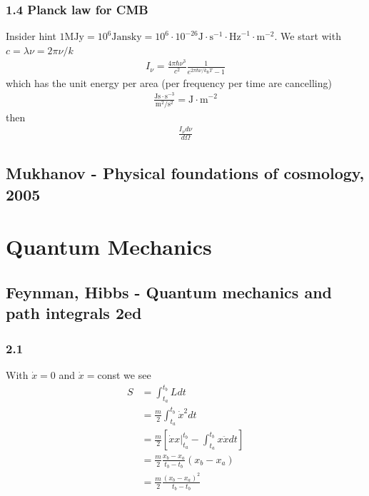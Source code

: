 \documentclass[10pt,a4paper]{book}
\theoremstyle{definition}
\begin{document}
\subsection{1.4 Planck law for CMB}
Insider hint $1\text{MJy} =10^6\text{Jansky}=10^6\cdot10^{-26}\text{J}\cdot\text{s}^{-1}\cdot\text{Hz}^{-1}\cdot\text{m}^{-2}$. We start with $c=\lambda\nu=2\pi\nu/k$
\begin{align}
I_\nu=\frac{4\pi\hbar\nu^3}{c^2}\frac{1}{e^{2\pi\hbar\nu/k_\text{B}T}-1}
\end{align}
which has the unit energy per area (per frequency per time are cancelling)
\begin{align}
\frac{\text{Js}\cdot \text{s}^{-3}}{\text{m}^2/\text{s}^2}=\text{J}\cdot\text{m}^{-2}
\end{align}
then
\begin{align}
\frac{I_\nu d\nu}{d\Omega}
\end{align}

\section{{\sc Mukhanov} - Physical foundations of cosmology, 2005}

\chapter{Quantum Mechanics}
\section{{\sc Feynman, Hibbs} - Quantum mechanics and path integrals 2ed}
\subsection{2.1}
With $\dot x=0$ and $\dot x=$const we see
\begin{align}
    S&=\int_{t_a}^{t_b}L dt\\
    &=\frac{m}{2}\int_{t_a}^{t_b}\dot x^2 dt\\
    &=\frac{m}{2}\left[\left.\dot x x\right|_{t_a}^{t_b}-\int_{t_a}^{t_b} x\ddot xdt\right]\\
    &=\frac{m}{2}\frac{x_b-x_a}{t_b-t_b}(x_b-x_a)\\
     &=\frac{m}{2}\frac{(x_b-x_a)^2}{t_b-t_b}
\end{align}
\end{document}
